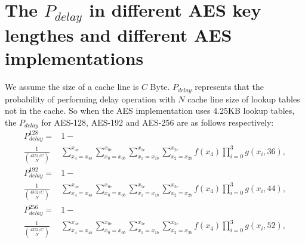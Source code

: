 \section{The $P_{delay}$ in different AES key lengthes and different AES implementations }
\label{appendixb}
We assume the size of a cache line is $C$ Byte. $P_{delay}$ represents that the probability of performing delay operation with $N$ cache line size of lookup tables not in the cache. So when the AES implementation uses 4.25KB lookup tables, the $P_{delay}$ for AES-128, AES-192 and AES-256 are as follows respectively:
\begin{align}
    P_{delay}^{128} = &1-   \nonumber \\
    \frac{1}{\binom{4352/C}{N}}&\sum_{x_4=x_{4b}}^{x_{4e}}{\sum_{x_0=x_{0b}}^{x_{0e}}{\sum_{x_1=x_{1b}}^{x_{1e}}{ \sum_{x_2=x_{2b}}^{x_{2e}}{f(x_4)\prod_{i=0}^{3}{g(x_i,36)}}}}}, \nonumber
\end{align}
\begin{align}
    P_{delay}^{192} = &1-  \nonumber \\
    \frac{1}{\binom{4352/C}{N}}&\sum_{x_4=x_{4b}}^{x_{4e}}{\sum_{x_0=x_{0b}}^{x_{0e}}{\sum_{x_1=x_{1b}}^{x_{1e}}{ \sum_{x_2=x_{2b}}^{x_{2e}}{f(x_4)\prod_{i=0}^{3}{g(x_i,44)}}}}}, \nonumber
\end{align}
\begin{align}
    P_{delay}^{256} = &1-  \nonumber \\
    \frac{1}{\binom{4352/C}{N}}&\sum_{x_4=x_{4b}}^{x_{4e}}{\sum_{x_0=x_{0b}}^{x_{0e}}{\sum_{x_1=x_{1b}}^{x_{1e}}{ \sum_{x_2=x_{2b}}^{x_{2e}}{f(x_4)\prod_{i=0}^{3}{g(x_i,52)}}}}}, \nonumber
\end{align}

